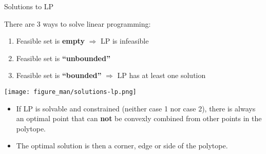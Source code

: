 \documentclass[11pt,compress,t,notes=noshow, xcolor=table]{beamer}
\begin{document}
\begin{vbframe}{Solutions to LP}

There are 3 ways to solve linear programming:

\begin{enumerate}
\item Feasible set is \textbf{empty} $\Rightarrow$ LP is infeasible
\item Feasible set is \textbf{\enquote{unbounded}}
\item Feasible set is \textbf{\enquote{bounded}} $\Rightarrow$ LP has at least one solution
\end{enumerate}

\vspace{\baselineskip}

\begin{center}
    \texttt{[image: figure\_man/solutions-lp.png]}
\end{center}


\framebreak

\begin{itemize}
\item If LP is solvable and constrained (neither case 1 nor case 2), there is always an optimal point that can  \textbf{not} be convexly combined from other points in the polytope.
\item The optimal solution is then a corner, edge or side of the polytope.
\end{itemize}


\end{vbframe}








\end{document}
